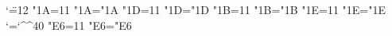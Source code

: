 %
%
%
%
%
%
%
%
%
%
%
%
%
%
%
%
\begingroup
%
\catcode`\"=12
%
%
%
\catcode"1A=11 \lccode"1A="1A %
\catcode"1D=11 \lccode"1D="1D %
\catcode"1B=11 \lccode"1B="1B %
\catcode"1E=11 \lccode"1E="1E %
%
\def\ae{^^Z}
\def\oe{^^[}
%
%
%
\ifnum`\@=`\^^40 %
  \catcode"E6=11 \lccode"E6="E6 %

